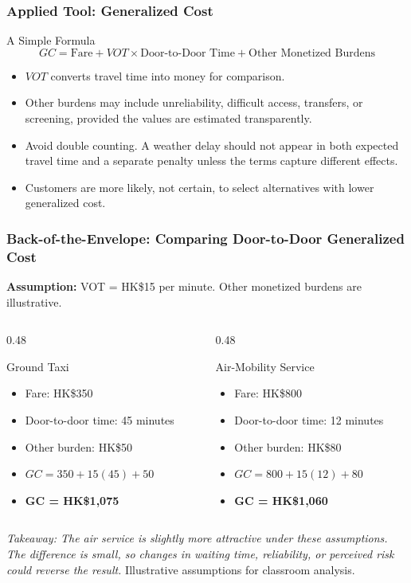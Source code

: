 \documentclass{beamer}
\begin{document}
\begin{frame}[t]
\frametitle{Applied Tool: Generalized Cost}
\begin{block}{A Simple Formula}
\[
GC=\text{Fare}+VOT\times\text{Door-to-Door Time}+\text{Other Monetized Burdens}
\]
\end{block}
\begin{itemize}
\item $VOT$ converts travel time into money for comparison.
\item Other burdens may include unreliability, difficult access, transfers, or screening, provided the values are estimated transparently.
\item Avoid double counting. A weather delay should not appear in both expected travel time and a separate penalty unless the terms capture different effects.
\item Customers are more likely, not certain, to select alternatives with lower generalized cost.
\end{itemize}
\end{frame}

\begin{frame}[t,shrink=10]
\frametitle{Back-of-the-Envelope: Comparing Door-to-Door Generalized Cost}
\textbf{Assumption:} VOT = HK\$15 per minute. Other monetized burdens are illustrative.
\begin{columns}[T]
\begin{column}{0.48\textwidth}\begin{block}{Ground Taxi}
\begin{itemize}
\item Fare: HK\$350
\item Door-to-door time: 45 minutes
\item Other burden: HK\$50
\item $GC=350+15(45)+50$
\item \textbf{GC = HK\$1,075}
\end{itemize}\end{block}\end{column}
\begin{column}{0.48\textwidth}\begin{block}{Air-Mobility Service}
\begin{itemize}
\item Fare: HK\$800
\item Door-to-door time: 12 minutes
\item Other burden: HK\$80
\item $GC=800+15(12)+80$
\item \textbf{GC = HK\$1,060}
\end{itemize}\end{block}\end{column}
\end{columns}
\textit{Takeaway: The air service is slightly more attractive under these assumptions. The difference is small, so changes in waiting time, reliability, or perceived risk could reverse the result.}
\vfill{\tiny Illustrative assumptions for classroom analysis.}
\end{frame}
\end{document}
